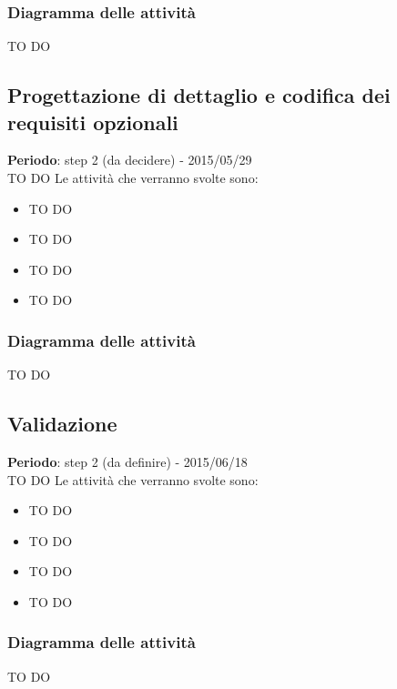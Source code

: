 		\subsubsection{Diagramma delle attività} %
		\label{ssub:diagramma_delle_attivita}
		TO DO
	
	\subsection{Progettazione di dettaglio e codifica dei requisiti opzionali} %
	\label{sub:progettazione_di_dettaglio_e_codifica_dei_requisiti_opzionali}
	\textbf{Periodo}:  step 2 (da decidere) - 2015/05/29 \\
	TO DO
	Le attività che verranno svolte sono:
		\begin{itemize}
			\item TO DO
			\item TO DO
			\item TO DO
			\item TO DO
		\end{itemize}
			
		\subsubsection{Diagramma delle attività} %
		\label{ssub:diagramma_delle_attivita}
		TO DO
	
	\subsection{Validazione} %
	\label{sub:validazione}
	\textbf{Periodo}:  step 2 (da definire) - 2015/06/18 \\
	TO DO
	Le attività che verranno svolte sono:
		\begin{itemize}
			\item TO DO
			\item TO DO
			\item TO DO
			\item TO DO
		\end{itemize}
		
		\subsubsection{Diagramma delle attività} %
		\label{ssub:diagramma_delle_attivita}
		TO DO
	
	
